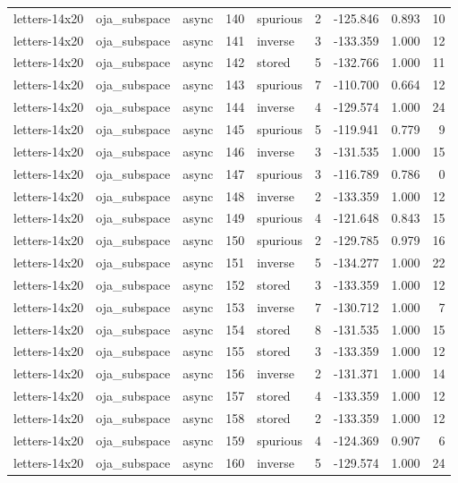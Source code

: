 \begin{tabular}{lllrlrrrr}
letters-14x20 & oja\_subspace & async & 140 & spurious & 2 & -125.846 & 0.893 & 10 \\
letters-14x20 & oja\_subspace & async & 141 & inverse & 3 & -133.359 & 1.000 & 12 \\
letters-14x20 & oja\_subspace & async & 142 & stored & 5 & -132.766 & 1.000 & 11 \\
letters-14x20 & oja\_subspace & async & 143 & spurious & 7 & -110.700 & 0.664 & 12 \\
letters-14x20 & oja\_subspace & async & 144 & inverse & 4 & -129.574 & 1.000 & 24 \\
letters-14x20 & oja\_subspace & async & 145 & spurious & 5 & -119.941 & 0.779 & 9 \\
letters-14x20 & oja\_subspace & async & 146 & inverse & 3 & -131.535 & 1.000 & 15 \\
letters-14x20 & oja\_subspace & async & 147 & spurious & 3 & -116.789 & 0.786 & 0 \\
letters-14x20 & oja\_subspace & async & 148 & inverse & 2 & -133.359 & 1.000 & 12 \\
letters-14x20 & oja\_subspace & async & 149 & spurious & 4 & -121.648 & 0.843 & 15 \\
letters-14x20 & oja\_subspace & async & 150 & spurious & 2 & -129.785 & 0.979 & 16 \\
letters-14x20 & oja\_subspace & async & 151 & inverse & 5 & -134.277 & 1.000 & 22 \\
letters-14x20 & oja\_subspace & async & 152 & stored & 3 & -133.359 & 1.000 & 12 \\
letters-14x20 & oja\_subspace & async & 153 & inverse & 7 & -130.712 & 1.000 & 7 \\
letters-14x20 & oja\_subspace & async & 154 & stored & 8 & -131.535 & 1.000 & 15 \\
letters-14x20 & oja\_subspace & async & 155 & stored & 3 & -133.359 & 1.000 & 12 \\
letters-14x20 & oja\_subspace & async & 156 & inverse & 2 & -131.371 & 1.000 & 14 \\
letters-14x20 & oja\_subspace & async & 157 & stored & 4 & -133.359 & 1.000 & 12 \\
letters-14x20 & oja\_subspace & async & 158 & stored & 2 & -133.359 & 1.000 & 12 \\
letters-14x20 & oja\_subspace & async & 159 & spurious & 4 & -124.369 & 0.907 & 6 \\
letters-14x20 & oja\_subspace & async & 160 & inverse & 5 & -129.574 & 1.000 & 24 \\

\end{tabular}
